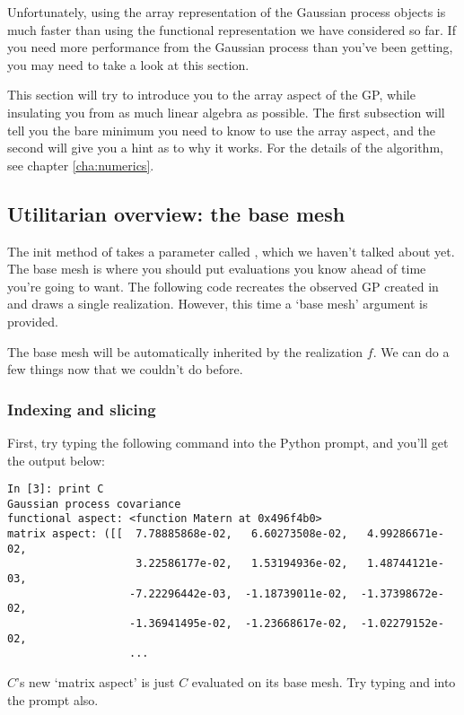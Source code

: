 \documentclass{manual}
\begin{document}
Unfortunately, using the array representation of the Gaussian process objects is much faster than using the functional representation we have considered so far. If you need more performance from the Gaussian process than you've been getting, you may need to take a look at this section.

This section will try to introduce you to the array aspect of the GP, while insulating you from as much linear algebra as possible. The first subsection will tell you the bare minimum you need to know to use the array aspect, and the second will give you a hint as to why it works. For the details of the algorithm, see chapter \ref{cha:numerics}.

\subsection{Utilitarian overview: the base mesh}

The init method of  takes a parameter called , which we haven't talked about yet. The base mesh is where you should put evaluations you know ahead of time you're going to want. The following code recreates the observed GP created in  and draws a single realization. However, this time a `base mesh' argument is provided.


The base mesh will be automatically inherited by the realization $f$. We can do a few things now that we couldn't do before.

\subsubsection{Indexing and slicing}\label{subsub:indexslice}
First, try typing the following command into the Python prompt, and you'll get the output below:
\begin{verbatim}
In [3]: print C
Gaussian process covariance
functional aspect: <function Matern at 0x496f4b0>
matrix aspect: ([[  7.78885868e-02,   6.60273508e-02,   4.99286671e-02,
                    3.22586177e-02,   1.53194936e-02,   1.48744121e-03,
                   -7.22296442e-03,  -1.18739011e-02,  -1.37398672e-02,
                   -1.36941495e-02,  -1.23668617e-02,  -1.02279152e-02,
                   ...
\end{verbatim}
$C$'s new `matrix aspect' is just $C$ evaluated on its base mesh. Try typing  and  into the prompt also. 
\end{document}

